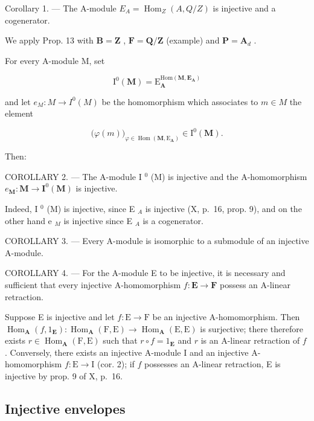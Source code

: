 Corollary 1. --- The A-module \(E_{A} = \operatorname{Hom}_{Z}(A, Q/Z)\) is injective and a cogenerator.

We apply Prop. 13 with \(\mathbf{B} = \mathbf{Z}\) , \(\mathbf{F} = \mathbf{Q} / \mathbf{Z}\) (example) and \(\mathbf{P} = \mathbf{A}_d\) .

For every A-module M, set

\[
\mathrm{I} ^ {0} (\mathbf {M}) = \mathrm{E} _ {\mathbf {A}} ^ {\mathrm{Hom} (\mathbf {M}, \mathbf {E} _ {\mathbf {A}})}
\]

and let \(e_{M}: M \to I^{0}(M)\) be the homomorphism which associates to \(m \in M\) the element

\[
\big (\varphi (m) \big) _ {\varphi \in \operatorname{Hom} (\mathbf {M}, \mathrm{E} _ {\mathbf {A}})} \in \mathrm{I} ^ {0} (\mathbf {M}).
\]

Then:

COROLLARY 2. --- The A-module I \(^{0}\) (M) is injective and the A-homomorphism \(e_{\mathbf{M}} : \mathbf{M} \to \mathbf{I}^{0}(\mathbf{M})\) is injective.

Indeed, I \(^{0}\) (M) is injective, since E \(_{A}\) is injective (X, p.~16, prop. 9), and on the other hand e \(_{M}\) is injective since E \(_{A}\) is a cogenerator.

COROLLARY 3. --- Every A-module is isomorphic to a submodule of an injective A-module.

COROLLARY 4. --- For the A-module E to be injective, it is necessary and sufficient that every injective A-homomorphism \(f: \mathbf{E} \to \mathbf{F}\) possess an A-linear retraction.

Suppose E is injective and let \(f: \mathrm{E} \to \mathrm{F}\) be an injective A-homomorphism. Then \(\operatorname{Hom}_{\mathbf{A}}(f, 1_{\mathbf{E}}): \operatorname{Hom}_{\mathbf{A}}(\mathrm{F}, \mathrm{E}) \to \operatorname{Hom}_{\mathbf{A}}(\mathrm{E}, \mathrm{E})\) is surjective; there therefore exists \(r \in \operatorname{Hom}_{\mathbf{A}}(\mathrm{F}, \mathrm{E})\) such that \(r \circ f = 1_{\mathbf{E}}\) and \(r\) is an A-linear retraction of \(f\) . Conversely, there exists an injective A-module I and an injective A-homomorphism \(f: \mathrm{E} \to \mathrm{I}\) (cor. 2); if \(f\) possesses an A-linear retraction, E is injective by prop. 9 of X, p.~16.

\subsection{Injective envelopes}

